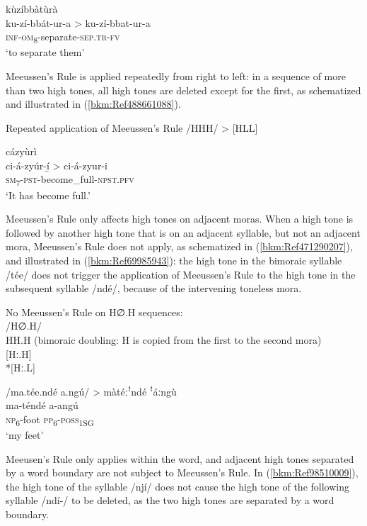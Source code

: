 \ex
kùzíbbàtùrà\\
ku-zí-bbát-ur-a > ku-zí-bbat-ur-a\\
\textsc{inf}-\textsc{om}\textsubscript{8}-separate-\textsc{sep}.\textsc{tr}-\textsc{fv}\\
\glt ‘to separate them’
\z\z

Meeussen’s Rule is applied repeatedly from right to left: in a sequence of more than two high tones, all high tones are deleted except for the first, as schematized and illustrated in (\ref{bkm:Ref488661088}).

\ea
\label{bkm:Ref488661088}
  Repeated application of Meeussen’s Rule
  \ea
  /HHH/ > [HLL]

\ex
cázyùrì \\
ci-á-zyúr-í̲ > ci-á-zyur-i\\
\textsc{sm}\textsubscript{7}-\textsc{pst}-become\_full-\textsc{npst}.\textsc{pfv}\\
\glt ‘It has become full.’
\z\z

Meeussen’s Rule only affects high tones on adjacent moras. When a high tone is followed by an\-other high tone that is on an adjacent syllable, but not an adjacent mora, Meeussen’s Rule does not apply, as schematized in (\ref{bkm:Ref471290207}), and illustrated in (\ref{bkm:Ref69985943}): the high tone in the bimoraic syllable /tée/ does not trigger the application of Meeussen’s Rule to the high tone in the subsequent syllable /ndé/, because of the intervening toneless mora.

\ea
\label{bkm:Ref471290207}
No Meeussen’s Rule on H∅.H sequences:\\
/H∅.H/\\
HH.H    (bimoraic doubling: H is copied from the first to the second mora)\\
{}[Hː.H]\\
*[Hː.L]
\z

\ea
\label{bkm:Ref69985943}
/ma.tée.ndé a.ngú/ > màtéːꜝndé ꜝáːngù\\
\gll ma-téndé  a-angú\\
\textsc{np}\textsubscript{6}-foot  \textsc{pp}\textsubscript{6}-\textsc{poss}\textsubscript{1SG}\\
\glt ‘my feet’
\z

Meeusen’s Rule only applies within the word, and adjacent high tones separated by a word boundary are not subject to Meeussen’s Rule. In (\ref{bkm:Ref98510009}), the high tone of the syllable /njí/ does not cause the high tone of the following syllable /ndí-/ to be deleted, as the two high tones are separated by a word boundary.

